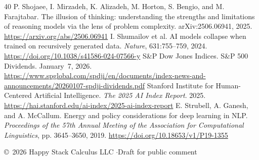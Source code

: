 \documentclass[10pt,a4paper,twocolumn]{article}
\begin{document}
{\begin{thebibliography}{40}
 P. Shojaee, I. Mirzadeh, K. Alizadeh, M. Horton, S. Bengio, and M. Farajtabar. The illusion of thinking: understanding the strengths and limitations of reasoning models via the lens of problem complexity. arXiv:2506.06941, 2025. \url{https://arxiv.org/abs/2506.06941}
 I. Shumailov et al. AI models collapse when trained on recursively generated data. \emph{Nature}, 631:755--759, 2024. \url{https://doi.org/10.1038/s41586-024-07566-y}
 S\&P Dow Jones Indices. S\&P 500 Dividends. January~7, 2026. \url{https://www.spglobal.com/spdji/en/documents/index-news-and-announcements/20260107-spdji-dividends.pdf}
 Stanford Institute for Human-Centered Artificial Intelligence. \emph{The 2025 AI Index Report}. 2025. \url{https://hai.stanford.edu/ai-index/2025-ai-index-report}
 E. Strubell, A. Ganesh, and A. McCallum. Energy and policy considerations for deep learning in NLP. \emph{Proceedings of the 57th Annual Meeting of the Association for Computational Linguistics}, pp. 3645--3650, 2019. \url{https://doi.org/10.18653/v1/P19-1355}
\end{thebibliography}

\vfill
\begin{center}
{\scriptsize\copyright\ 2026 Happy Stack Calculus LLC \quad$\cdot$\quad Draft for public comment\par}
\end{center}
}
\end{document}

